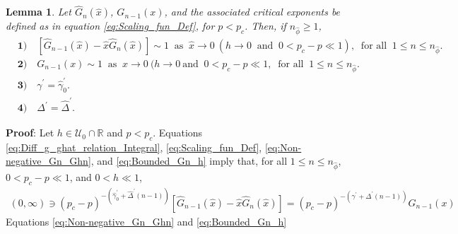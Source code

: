 \documentclass[english,12pt,jmp,graphicx]{revtex4-1}
\newtheorem{lemma}{Lemma}[section]
\newcommand{\ph}{\hat{\phi}}
\newcommand{\gh}{\hat{\gamma}}
\newcommand{\Dh}{\hat{\Delta}}
\newcommand{\xh}{\hat{x}}
\begin{document}
%
%
 \begin{lemma}\label{lem:asymp_Scaling_funs_x_to_0_p<pc}
   Let $\hat{G}_n(\xh)$, $G_{n-1}(x)$, and the associated critical
   exponents be defined as in equation \eqref{eq:Scaling_fun_Def}, for
   $p<p_c$. Then, if $n_{\ph}\geq1$,
     \begin{align*}
    &\mathbf{1)}\quad [\hat{G}_{n-1}(\xh)-\xh\hat{G}_n(\xh)]\sim1 \ \text{ as } \ \xh\to0 \ (h\to0
    \ \text{ and } \ 0<p_c-p\ll1), \ \text{ for all } \ 1\leq n\leq n_{\ph}. \\
    &\mathbf{2)}\quad G_{n-1}(x)\sim1 \ \text{ as } \ x\to0 \ (h\to0 \ \text{
      and } \ 0<p_c-p\ll1, \ \text{ for all } \ 1\leq n\leq n_{\ph}.\\
    &\mathbf{3)}\quad \gamma^\prime=\gh_0^\prime.  \\%
    &\mathbf{4)}\quad \Delta^\prime=\Dh^\prime.   
     \end{align*}
 \end{lemma}
%
\noindent \textbf{Proof}:
%
Let $h\in\mathcal{U}_0\cap\mathbb{R}$ and $p<p_c$.
Equations \eqref{eq:Diff_g_ghat_relation_Integral}, 
\eqref{eq:Scaling_fun_Def}, \eqref{eq:Non-negative_Gn_Ghn}, and
\eqref{eq:Bounded_Gn_h} imply that, 
for all $1\leq n\leq n_{\ph}$, $0<p_c-p\ll1$, and $0<h\ll1$,  
%
\begin{align}\label{eq:x_infty_p<pc}
  (0,\infty)\ni(p_c-p)^{-(\gh_0^\prime+\Dh^\prime(n-1))}[\hat{G}_{n-1}(\xh)-\xh\hat{G}_n(\xh)]
       =(p_c-p)^{-(\gamma^\prime+\Delta^\prime(n-1))}G_{n-1}(x)
\end{align}
%
Equations \eqref{eq:Non-negative_Gn_Ghn} and \eqref{eq:Bounded_Gn_h}
\end{document}
